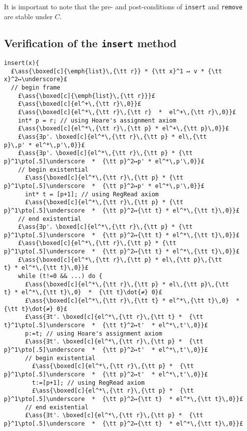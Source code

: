 \documentclass[12pt,a4paper]{article}
\makeatletter
\newcommand{\ml}[2][t]{\mbox{\mdseries\begin{tabular}[#1]{@{}L@{}}#2\end{tabular}}}
\newcommand{\ass}[1]{\ensuremath{{\color{blue}\left\{\ml[c]{#1}\right\}}}}
\makeatother
\begin{document}
\noindent It is important to note that the pre- and post-conditions of {\tt insert} and {\tt remove} are stable under $C$. 

\subsection{Verification of the {\tt insert} method}

\begin{lstlisting}
insert(x){
  £\ass{\boxed[c]{\emph{list}\,{\tt r}} * {\tt x}^1 ↦ v * {\tt x}^2↦\underscore}£
  // begin frame
    £\ass{\boxed[c]{\emph{list}\,{\tt r}}}£
    £\ass{\boxed[c]{el^+\,{\tt r}\,0}}£
    £\ass{\boxed[c]{el^*\,{\tt r}\,{\tt r}  *  el^+\,{\tt r}\,0}}£
    int* p = r; // using Hoare's assignment axiom
    £\ass{\boxed[c]{el^*\,{\tt r}\,{\tt p} * el^+\,{\tt p}\,0}}£
    £\ass{∃p'．\boxed[c]{el^*\,{\tt r}\,{\tt p} * el\,{\tt p}\,p' * el^*\,p'\,0}}£
    £\ass{∃p'．\boxed[c]{el^*\,{\tt r}\,{\tt p} * {\tt p}^1\pto[.5]\underscore  *  {\tt p}^2↦p' * el^*\,p'\,0}}£
    // begin existential
      £\ass{\boxed[c]{el^*\,{\tt r}\,{\tt p} * {\tt p}^1\pto[.5]\underscore  *  {\tt p}^2↦p' * el^*\,p'\,0}}£
      int* t = [p+1]; // using RegRead axiom
      £\ass{\boxed[c]{el^*\,{\tt r}\,{\tt p} * {\tt p}^1\pto[.5]\underscore  *  {\tt p}^2↦{\tt t} * el^*\,{\tt t}\,0}}£
    // end existential
    £\ass{∃p'．\boxed[c]{el^*\,{\tt r}\,{\tt p} * {\tt p}^1\pto[.5]\underscore  *  {\tt p}^2↦{\tt t} * el^*\,{\tt t}\,0}}£
    £\ass{\boxed[c]{el^*\,{\tt r}\,{\tt p} * {\tt p}^1\pto[.5]\underscore  *  {\tt p}^2↦{\tt t} * el^*\,{\tt t}\,0}}£
    £\ass{\boxed[c]{el^*\,{\tt r}\,{\tt p} * el\,{\tt p}\,{\tt t} * el^*\,{\tt t}\,0}}£
    while (t!=0 && ...) do {
      £\ass{\boxed[c]{el^*\,{\tt r}\,{\tt p} * el\,{\tt p}\,{\tt t} * el^*\,{\tt t}\,0}  *  {\tt t}\dot{≠} 0}£
      £\ass{\boxed[c]{el^*\,{\tt r}\,{\tt t} * el^*\,{\tt t}\,0}  *  {\tt t}\dot{≠} 0}£
      £\ass{∃t'．\boxed[c]{el^*\,{\tt r}\,{\tt t} *  {\tt t}^1\pto[.5]\underscore  *  {\tt t}^2↦t'  * el^*\,t'\,0}}£
      p:=t; // using Hoare's assignment axiom
      £\ass{∃t'．\boxed[c]{el^*\,{\tt r}\,{\tt p} *  {\tt p}^1\pto[.5]\underscore  *  {\tt p}^2↦t'  * el^*\,t'\,0}}£
      // begin existential
        £\ass{\boxed[c]{el^*\,{\tt r}\,{\tt p} *  {\tt p}^1\pto[.5]\underscore  *  {\tt p}^2↦t'  * el^*\,t'\,0}}£
        t:=[p+1]; // using RegRead axiom
        £\ass{\boxed[c]{el^*\,{\tt r}\,{\tt p} *  {\tt p}^1\pto[.5]\underscore  *  {\tt p}^2↦{\tt t}  * el^*\,{\tt t}\,0}}£
      // end existential
      £\ass{∃t'．\boxed[c]{el^*\,{\tt r}\,{\tt p} *  {\tt p}^1\pto[.5]\underscore  *  {\tt p}^2↦{\tt t}  * el^*\,{\tt t}\,0}}£

\end{lstlisting}
\end{document}
